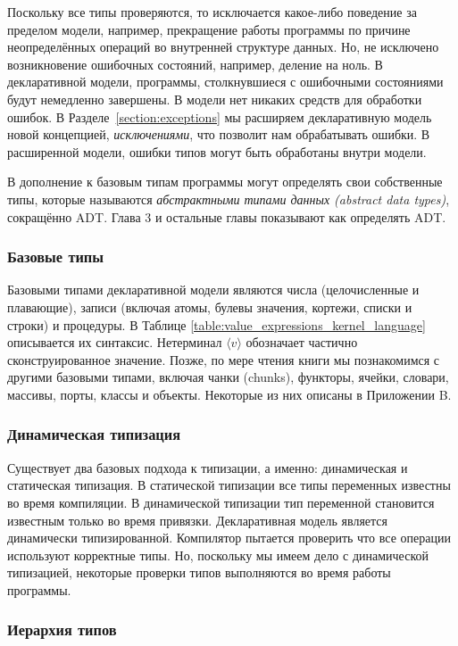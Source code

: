 Поскольку все типы проверяются, то исключается какое-либо поведение за пределом модели, например, прекращение работы программы по причине неопределённых операций во внутренней структуре данных. Но, не исключено возникновение ошибочных состояний, например, деление на ноль. В декларативной модели, программы, столкнувшиеся с ошибочными состояниями будут немедленно завершены. В модели нет никаких средств для обработки ошибок. В Разделе~\ref{section:exceptions} мы расширяем декларативную модель новой концепцией, \emph{исключениями}, что позволит нам обрабатывать ошибки. В расширенной модели, ошибки типов могут быть обработаны внутри модели.

В дополнение к базовым типам программы могут определять свои собственные типы, которые называются \emph{абстрактными типами данных ({abstract data types})}, сокращённо ADT. Глава 3 и остальные главы показывают как определять ADT.

\subsubsection{Базовые типы}

Базовыми типами декларативной модели являются числа (целочисленные и плавающие), записи (включая атомы, булевы значения, кортежи, списки и строки) и процедуры. В Таблице \ref{table:value_expressions_kernel_language} описывается их синтаксис. Нетерминал $\langle v \rangle$ обозначает частично сконструированное значение. Позже, по мере чтения книги мы познакомимся с другими базовыми типами, включая чанки (chunks), функторы, ячейки, словари, массивы, порты, классы и объекты. Некоторые из них описаны в Приложении B.

\subsubsection{Динамическая типизация}

Существует два базовых подхода к типизации, а именно: динамическая и статическая типизация. В статической типизации все типы переменных известны во время компиляции. В динамической типизации тип переменной становится известным только во время привязки. Декларативная модель является динамически типизированной. Компилятор пытается проверить что все операции используют корректные типы. Но, поскольку мы имеем дело с динамической типизацией, некоторые проверки типов выполняются во время работы программы.

\subsubsection{Иерархия типов}

